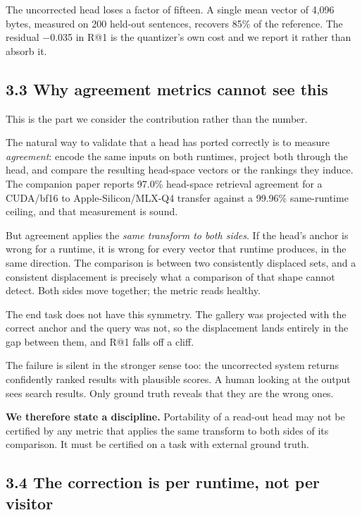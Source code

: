 \documentclass[
  11pt,
]{article}
\begin{document}
The uncorrected head loses a factor of fifteen. A single mean vector of
4,096 bytes, measured on 200 held-out sentences, recovers 85\% of the
reference. The residual −0.035 in R@1 is the quantizer's own cost and we
report it rather than absorb it.

\subsection{3.3 Why agreement metrics cannot see
this}\label{why-agreement-metrics-cannot-see-this}

This is the part we consider the contribution rather than the number.

The natural way to validate that a head has ported correctly is to
measure \emph{agreement}: encode the same inputs on both runtimes,
project both through the head, and compare the resulting head-space
vectors or the rankings they induce. The companion paper reports 97.0\%
head-space retrieval agreement for a CUDA/bf16 to Apple-Silicon/MLX-Q4
transfer against a 99.96\% same-runtime ceiling, and that measurement is
sound.

But agreement applies the \emph{same transform to both sides}. If the
head's anchor is wrong for a runtime, it is wrong for every vector that
runtime produces, in the same direction. The comparison is between two
consistently displaced sets, and a consistent displacement is precisely
what a comparison of that shape cannot detect. Both sides move together;
the metric reads healthy.

The end task does not have this symmetry. The gallery was projected with
the correct anchor and the query was not, so the displacement lands
entirely in the gap between them, and R@1 falls off a cliff.

The failure is silent in the stronger sense too: the uncorrected system
returns confidently ranked results with plausible scores. A human
looking at the output sees search results. Only ground truth reveals
that they are the wrong ones.

\textbf{We therefore state a discipline.} Portability of a read-out head
may not be certified by any metric that applies the same transform to
both sides of its comparison. It must be certified on a task with
external ground truth.

\subsection{3.4 The correction is per runtime, not per
visitor}\label{the-correction-is-per-runtime-not-per-visitor}
\end{document}
